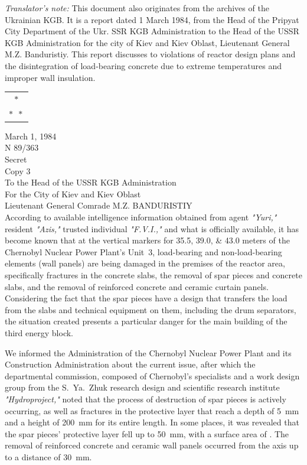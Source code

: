 \documentclass[openright]{bookest}
\newcommand{\varthreestars}{\begin{center}\begin{tabular}{c}$\ast$\\[-0.8ex] $\ast\enspace \ast $\end{tabular}\end{center}}
\begin{document}
\textit{Translator's note:} This document also originates from the archives of the Ukrainian KGB. It is a report dated 1 March 1984, from the Head of the Pripyat City Department of the Ukr. SSR KGB Administration to the Head of the USSR KGB Administration for the city of Kiev and Kiev Oblast, Lieutenant General M.Z. Banduristiy. This report discusses to violations of reactor design plans and the disintegration of load-bearing concrete due to extreme temperatures and improper wall insulation.

\varthreestars

March 1, 1984 \\

N 89/363 \\

Secret \\

Copy 3 \\

To the Head of the USSR KGB Administration \\

For the City of Kiev and Kiev Oblast \\

Lieutenant General Comrade M.Z. BANDURISTIY \\

According to available intelligence information obtained from agent \textit{"Yuri,"} resident \textit{"Azis,"} trusted individual \textit{"F.V.I.,"} and what is officially available, it has become known that at the vertical markers for \numlist{35.5; 39.0; 43.0} meters of the Chernobyl Nuclear Power Plant's Unit~3, load-bearing and non-load-bearing elements (wall panels) are being damaged in the premises of the reactor area, specifically fractures in the concrete slabs, the removal of spar pieces and concrete slabs, and the removal of reinforced concrete and ceramic curtain panels. Considering the fact that the spar pieces have a design that transfers the load from the slabs and technical equipment on them, including the drum separators, the situation created presents a particular danger for the main building of the third energy block.

We informed the Administration of the Chernobyl Nuclear Power Plant and its Construction Administration about the current issue, after which the departmental commission, composed of Chernobyl's specialists and a work design group from the S.~Ya.~Zhuk research design and scientific research institute \textit{"Hydroproject,"} noted that the process of destruction of spar pieces is actively occurring, as well as fractures in the protective layer that reach a depth of \qty{5}{\milli\metre} and a height of \qty{200}{\milli\metre} for its entire length. In some places, it was revealed that the spar pieces' protective layer fell up to \qty{50}{\milli\metre}, with a surface area of . The removal of reinforced concrete and ceramic wall panels occurred from the axis up to a distance of \qty{30}{\milli\metre}.
\end{document}
